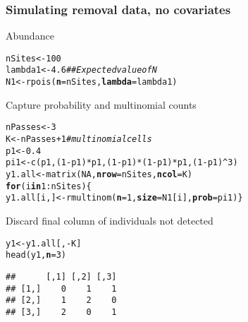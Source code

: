 \documentclass[color=usenames,dvipsnames]{beamer}\usepackage[]{graphicx}\usepackage[]{xcolor}
\makeatletter
\newcommand{\hlnum}[1]{\textcolor[rgb]{0.69,0.494,0}{#1}}%
\newcommand{\hlcom}[1]{\textcolor[rgb]{0.514,0.506,0.514}{\textit{#1}}}%
\newcommand{\hlopt}[1]{\textcolor[rgb]{0,0,0}{#1}}%
\newcommand{\hldef}[1]{\textcolor[rgb]{0,0,0}{#1}}%
\newcommand{\hlkwa}[1]{\textcolor[rgb]{0,0,0}{\textbf{#1}}}%
\newcommand{\hlkwb}[1]{\textcolor[rgb]{0,0.341,0.682}{#1}}%
\newcommand{\hlkwc}[1]{\textcolor[rgb]{0,0,0}{\textbf{#1}}}%
\newcommand{\hlkwd}[1]{\textcolor[rgb]{0.004,0.004,0.506}{#1}}%
\newenvironment{kframe}{%
 \def\at@end@of@kframe{}%
 \ifinner\ifhmode%
  \def\at@end@of@kframe{\end{minipage}}%
  \begin{minipage}{\columnwidth}%
 \fi\fi%
 \def\FrameCommand##1{\hskip\@totalleftmargin \hskip-\fboxsep
 \colorbox{shadecolor}{##1}\hskip-\fboxsep
     \hskip-\linewidth \hskip-\@totalleftmargin \hskip\columnwidth}%
 \MakeFramed {\advance\hsize-\width
   \@totalleftmargin\z@ \linewidth\hsize
   \@setminipage}}%
 {\par\unskip\endMakeFramed%
 \at@end@of@kframe}
\newenvironment{knitrout}{}{} %
\makeatother
\begin{document}
\begin{frame}[fragile]
  \frametitle{Simulating removal data, no covariates}
  \small
  Abundance
\begin{knitrout}\scriptsize
{}\color{fgcolor}\begin{kframe}
\begin{alltt}
\hldef{nSites} \hlkwb{<-} \hlnum{100}
\hldef{lambda1} \hlkwb{<-} \hlnum{4.6}  \hlcom{## Expected value of N}
\hldef{N1} \hlkwb{<-} \hlkwd{rpois}\hldef{(}\hlkwc{n}\hldef{=nSites,} \hlkwc{lambda}\hldef{=lambda1)}
\end{alltt}
\end{kframe}
\end{knitrout}
  \pause
  \vfill
  Capture probability and multinomial counts%
\begin{knitrout}\scriptsize
{}\color{fgcolor}\begin{kframe}
\begin{alltt}
\hldef{nPasses} \hlkwb{<-} \hlnum{3}
\hldef{K} \hlkwb{<-} \hldef{nPasses}\hlopt{+}\hlnum{1}  \hlcom{# multinomial cells}
\hldef{p1} \hlkwb{<-} \hlnum{0.4}
\hldef{pi1} \hlkwb{<-} \hlkwd{c}\hldef{(p1, (}\hlnum{1}\hlopt{-}\hldef{p1)}\hlopt{*}\hldef{p1, (}\hlnum{1}\hlopt{-}\hldef{p1)}\hlopt{*}\hldef{(}\hlnum{1}\hlopt{-}\hldef{p1)}\hlopt{*}\hldef{p1, (}\hlnum{1}\hlopt{-}\hldef{p1)}\hlopt{^}\hlnum{3}\hldef{)}
\hldef{y1.all} \hlkwb{<-} \hlkwd{matrix}\hldef{(}\hlnum{NA}\hldef{,} \hlkwc{nrow}\hldef{=nSites,} \hlkwc{ncol}\hldef{=K)}
\hlkwa{for}\hldef{(i} \hlkwa{in} \hlnum{1}\hlopt{:}\hldef{nSites) \{}
    \hldef{y1.all[i,]} \hlkwb{<-} \hlkwd{rmultinom}\hldef{(}\hlkwc{n}\hldef{=}\hlnum{1}\hldef{,} \hlkwc{size}\hldef{=N1[i],} \hlkwc{prob}\hldef{=pi1)    \}}
\end{alltt}
\end{kframe}
\end{knitrout}
  \pause
  \vfill
  Discard final column of individuals not detected
\begin{knitrout}\scriptsize
{}\color{fgcolor}\begin{kframe}
\begin{alltt}
\hldef{y1} \hlkwb{<-} \hldef{y1.all[,}\hlopt{-}\hldef{K]}
\hlkwd{head}\hldef{(y1,} \hlkwc{n}\hldef{=}\hlnum{3}\hldef{)}
\end{alltt}
\begin{verbatim}
##      [,1] [,2] [,3]
## [1,]    0    1    1
## [2,]    1    2    0
## [3,]    2    0    1
\end{verbatim}
\end{kframe}
\end{knitrout}
\end{frame}
\end{document}
